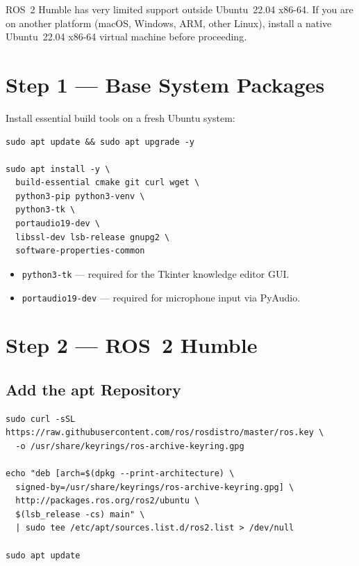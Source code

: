 \documentclass[12pt,a4paper]{report}
\newcommand{\file}[1]{\texttt{\color{black!70}#1}}
\begin{document}
\begin{tcolorbox}[warnbox, title=Platform Compatibility]
  ROS~2 Humble has very limited support outside Ubuntu~22.04 x86-64.
  If you are on another platform (macOS, Windows, ARM, other Linux),
  install a native Ubuntu~22.04 x86-64 virtual machine before proceeding.
\end{tcolorbox}

\section{Step 1 --- Base System Packages}

Install essential build tools on a fresh Ubuntu system:

\begin{lstlisting}[style=bashstyle, caption={Base system packages}]
sudo apt update && sudo apt upgrade -y

sudo apt install -y \
  build-essential cmake git curl wget \
  python3-pip python3-venv \
  python3-tk \
  portaudio19-dev \
  libssl-dev lsb-release gnupg2 \
  software-properties-common
\end{lstlisting}

\begin{itemize}[leftmargin=2em]
  \item \file{python3-tk} --- required for the Tkinter knowledge editor GUI.
  \item \file{portaudio19-dev} --- required for microphone input via PyAudio.
\end{itemize}

\section{Step 2 --- ROS~2 Humble}

\subsection{Add the apt Repository}

\begin{lstlisting}[style=bashstyle, caption={Add the ROS~2 package repository}]
sudo curl -sSL https://raw.githubusercontent.com/ros/rosdistro/master/ros.key \
  -o /usr/share/keyrings/ros-archive-keyring.gpg

echo "deb [arch=$(dpkg --print-architecture) \
  signed-by=/usr/share/keyrings/ros-archive-keyring.gpg] \
  http://packages.ros.org/ros2/ubuntu \
  $(lsb_release -cs) main" \
  | sudo tee /etc/apt/sources.list.d/ros2.list > /dev/null

sudo apt update
\end{lstlisting}
\end{document}

